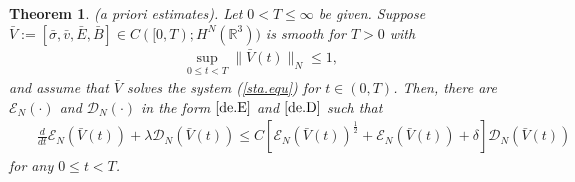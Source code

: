 \documentclass[11pt]{amsart}
\newtheorem{theorem}{Theorem}[section]
\numberwithin{equation}{section}
\begin{document}
\begin{theorem}\label{estimate}(\textrm{a priori estimates}).
Let $0<T\leq \infty$ be given. Suppose
$\bar{V}:=[\bar{\sigma},\bar{v},\bar{E},\bar{B}]\in
C([0,T);H^{N}(\mathbb{R}^{3}))$ is smooth for $T>0$ with
\begin{eqnarray}\label{3.1}
\sup_{0\leq t<T}\|\bar{V}(t)\|_{N}\leq 1,
\end{eqnarray}
and assume that $\bar{V}$ solves the system (\ref{sta.equ}) for
$t\in(0,T)$. Then, there are $\mathcal {E}_{N}(\cdot) $ and
$\mathcal {D}_{N}(\cdot)$ in the form $\eqref{de.E} $ and
$\eqref{de.D}$ such that
\begin{eqnarray}\label{3.2}
&& \frac{d}{dt}\mathcal {E}_{N}(\bar{V}(t))+\lambda\mathcal
{D}_{N}(\bar{V}(t))\leq
 C[\mathcal {E}_{N}(\bar{V}(t))^{\frac{1}{2}}+\mathcal {E}_{N}(\bar{V}(t))+\delta]\mathcal {D}_{N}(\bar{V}(t))
\end{eqnarray}
for any $0\leq t<T$.
\end{theorem}
\end{document}
